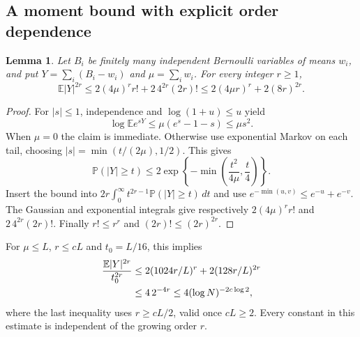 \documentclass[11pt]{article}
\newtheorem{lemma}[theorem]{Lemma}
\theoremstyle{remark}\newtheorem{remark}[theorem]{Remark}
\newcommand{\Prob}{\mathbb P}
\newcommand{\E}{\mathbb E}
\begin{document}
\subsection{A moment bound with explicit order dependence}
\begin{lemma}\label{lem:moment}
Let $B_i$ be finitely many independent Bernoulli variables of means
$w_i$, and put $Y=\sum_i(B_i-w_i)$ and $\mu=\sum_iw_i$.
For every integer $r\ge1$,
\begin{equation}\label{eq:moment}
 \E|Y|^{2r}\le2(4\mu)^r r!+2\,4^{2r}(2r)!
             \le2(4\mu r)^r+2(8r)^{2r}.
\end{equation}
\end{lemma}
\begin{proof}
For $|s|\le1$, independence and $\log(1+u)\le u$ yield
\[
 \log\E e^{sY}\le\mu(e^s-1-s)\le\mu s^2.
\]
When $\mu=0$ the claim is immediate. Otherwise use exponential Markov
on each tail, choosing $|s|=\min(t/(2\mu),1/2)$. This gives
\[
 \Prob(|Y|\ge t)\le2\exp\left\{-\min\left(\frac{t^2}{4\mu},
                                                   \frac t4\right)\right\}.
\]
Insert the bound into $2r\int_0^\infty t^{2r-1}\Prob(|Y|\ge t)\,dt$
and use $e^{-\min(u,v)}\le e^{-u}+e^{-v}$. The Gaussian and exponential
integrals give respectively $2(4\mu)^r r!$ and $2\,4^{2r}(2r)!$.
Finally $r!\le r^r$ and $(2r)!\le(2r)^{2r}$.
\end{proof}
For $\mu\le L$, $r\le cL$ and $t_0=L/16$, this implies
\begin{align}
 \frac{\E|Y|^{2r}}{t_0^{2r}}
 &\le2(1024r/L)^r+2(128r/L)^{2r}\notag\\
 &\le4\,2^{-4r}
 \le4(\log N)^{-2c\log2},\label{eq:normalized-moment}
\end{align}
where the last inequality uses $r\ge cL/2$, valid once $cL\ge2$.
Every constant in this estimate is independent of the growing order $r$.
\end{document}
